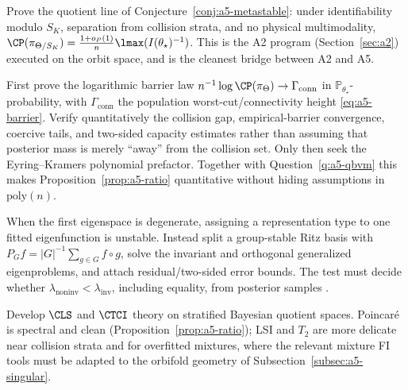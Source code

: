 \documentclass[../../main.tex]{subfiles}
\begin{document}
\begin{question}
\label{q:a5-qbvm}
Prove the quotient line of Conjecture~\ref{conj:a5-metastable}: under identifiability modulo
$S_K$, separation from collision strata, and no physical multimodality,
$\CP(\pi_{\Theta/S_K})=\tfrac{1+o_P(1)}{n}\lmax(I(\theta_\star)^{-1})$. This is the A2 program
(Section~\ref{sec:a2}) executed on the orbit space, and is the cleanest bridge between A2 and A5.
\end{question}

\begin{question}
\label{q:a5-metastable}
First prove the logarithmic barrier law
$n^{-1}\log\CP(\pi_\Theta)\to\Gamma_{\mathrm{conn}}$ in
$\mathbb P_{\theta_\star}$-probability, with $\Gamma_{\mathrm{conn}}$ the population
worst-cut/connectivity height \eqref{eq:a5-barrier}. Verify quantitatively the collision gap,
empirical-barrier convergence, coercive tails, and two-sided capacity estimates rather than
assuming that posterior mass is merely ``away'' from the collision set. Only then seek the
Eyring--Kramers polynomial prefactor. Together with Question~\ref{q:a5-qbvm} this makes
Proposition~\ref{prop:a5-ratio} quantitative without hiding assumptions in $\mathrm{poly}(n)$.
\end{question}

\begin{question}
\label{q:a5-detect}
When the first eigenspace is degenerate, assigning a representation type to one fitted
eigenfunction is unstable. Instead split a group-stable Ritz basis with
$P_Gf=|G|^{-1}\sum_{g\in G}f\circ g$, solve the invariant and orthogonal generalized
eigenproblems, and attach residual/two-sided error bounds. The test must decide whether
$\lambda_{\mathrm{noninv}}<\lambda_{\mathrm{inv}}$, including equality, from posterior samples
\cite{PillaudVivienEtAl2020}.
\end{question}

\begin{question}
\label{q:a5-stratified}
Develop $\CLS$ and $\CTCI$ theory on stratified Bayesian quotient spaces. Poincar\'e is
spectral and clean (Proposition~\ref{prop:a5-ratio}); LSI and $T_2$ are more delicate near
collision strata and for overfitted mixtures, where the relevant mixture FI tools
\cite{ChafaiMalrieu2010,Schlichting2019,ChenChewiNilesWeed2021} must be adapted to the orbifold
geometry of Subsection~\ref{subsec:a5-singular}.
\end{question}
\end{document}
